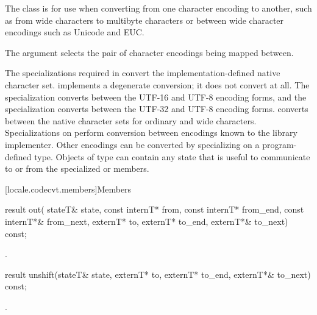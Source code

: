 \pnum
The class
is for use when
converting from one character encoding to another, such as from wide characters
to multibyte  characters or between wide character encodings such as
Unicode and EUC.

\pnum
The
argument selects the pair of character encodings being mapped between.

\pnum
The specializations required in 
convert the implementation-defined native character set.
implements a degenerate conversion;
it does not convert at all.
The specialization 
converts between the UTF-16 and UTF-8 encoding forms, and
the specialization  
converts between the UTF-32 and UTF-8 encoding forms.
converts between the native character sets for ordinary and wide characters.
Specializations on
perform conversion between encodings known to the library implementer.
Other encodings can be converted by specializing on a program-defined
type.
Objects of type
can contain any state that is useful to communicate to or from
the specialized
or
members.

[locale.codecvt.members]{Members}

%
\begin{itemdecl}
result out(
    stateT& state,
    const internT* from, const internT* from_end, const internT*& from_next,
    externT* to, externT* to_end, externT*& to_next) const;
\end{itemdecl}

\begin{itemdescr}
\pnum
\returns
{}.
\end{itemdescr}

%
\begin{itemdecl}
result unshift(stateT& state, externT* to, externT* to_end, externT*& to_next) const;
\end{itemdecl}

\begin{itemdescr}
\pnum
\returns
{}.
\end{itemdescr}


